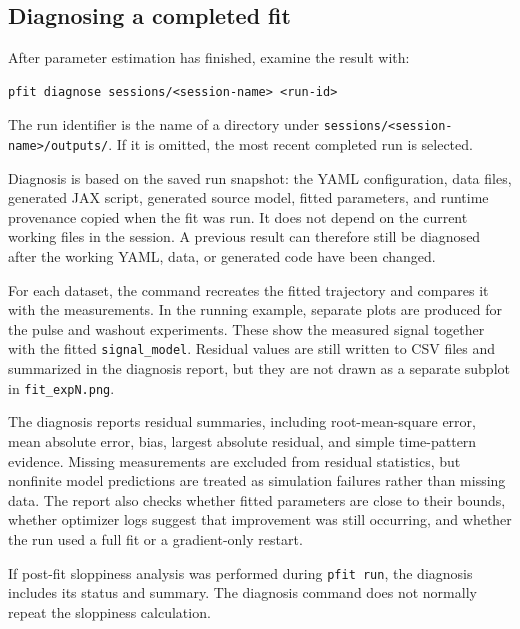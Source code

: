 
\subsection{Diagnosing a completed fit}

After parameter estimation has finished, examine the result with:

\begin{verbatim}
pfit diagnose sessions/<session-name> <run-id>
\end{verbatim}

The run identifier is the name of a directory under
\texttt{sessions/<session-name>/outputs/}. If it is omitted, the most recent
completed run is selected.

Diagnosis is based on the saved run snapshot: the YAML configuration, data
files, generated JAX script, generated source model, fitted parameters, and
runtime provenance copied when the fit was run. It does not depend on the
current working files in the session. A previous result can therefore still be
diagnosed after the working YAML, data, or generated code have been changed.

For each dataset, the command recreates the fitted trajectory and compares it
with the measurements. In the running example, separate plots are produced for
the pulse and washout experiments. These show the measured signal together with
the fitted \texttt{signal\_model}. Residual values are still written to CSV
files and summarized in the diagnosis report, but they are not drawn as a
separate subplot in \texttt{fit\_expN.png}.

The diagnosis reports residual summaries, including root-mean-square error,
mean absolute error, bias, largest absolute residual, and simple time-pattern
evidence. Missing measurements are excluded from residual statistics, but
nonfinite model predictions are treated as simulation failures rather than
missing data. The report also checks whether fitted parameters are close to
their bounds, whether optimizer logs suggest that improvement was still
occurring, and whether the run used a full fit or a gradient-only restart.

If post-fit sloppiness analysis was performed during \texttt{pfit run}, the
diagnosis includes its status and summary. The diagnosis command does not
normally repeat the sloppiness calculation.

